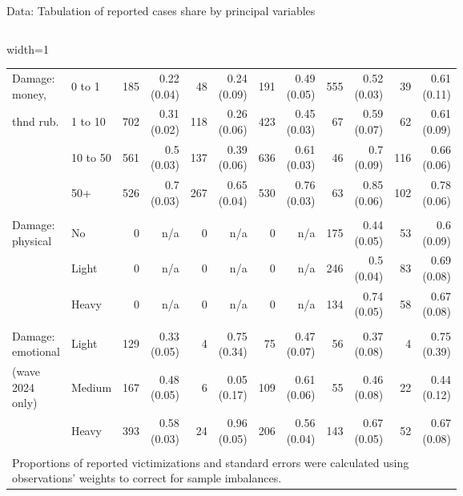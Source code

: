 \documentclass{beamer}
\begin{document}
\begin{frame}{Data: Tabulation of reported cases share by principal variables}
\begin{columns}
\begin{adjustbox}{width=1\textwidth}
\begin{tabular}{llrrrrrrrrrr}
					Damage: money,& 0 to 1 & 185 & 0.22 (0.04) & 48 & 0.24 (0.09) & 191 & 0.49 (0.05) & 555 & 0.52 (0.03) & 39 & 0.61 (0.11) \\ 
					thnd rub. & 1 to 10 & 702 & 0.31 (0.02) & 118 & 0.26 (0.06) & 423 & 0.45 (0.03) & 67 & 0.59 (0.07) & 62 & 0.61 (0.09) \\ 
					& 10 to 50 & 561 & 0.5 (0.03) & 137 & 0.39 (0.06) & 636 & 0.61 (0.03) & 46 & 0.7 (0.09) & 116 & 0.66 (0.06) \\ 
					& 50+ & 526 & 0.7 (0.03) & 267 & 0.65 (0.04) & 530 & 0.76 (0.03) & 63 & 0.85 (0.06) & 102 & 0.78 (0.06) \\ 
					\vspace{1pt}\\
					Damage: physical & No & 0 & n/a & 0 & n/a & 0 & n/a & 175 & 0.44 (0.05) & 53 & 0.6 (0.09) \\ 
					& Light & 0 & n/a & 0 & n/a & 0 & n/a & 246 & 0.5 (0.04) & 83 & 0.69 (0.08) \\ 
					& Heavy & 0 & n/a & 0 & n/a & 0 & n/a & 134 & 0.74 (0.05) & 58 & 0.67 (0.08) \\ 
					\vspace{1pt}\\
					Damage: emotional & Light & 129 & 0.33 (0.05) & 4 & 0.75 (0.34) & 75 & 0.47 (0.07) & 56 & 0.37 (0.08) & 4 & 0.75 (0.39) \\ 
					(wave 2024 only) & Medium & 167 & 0.48 (0.05) & 6 & 0.05 (0.17) & 109 & 0.61 (0.06) & 55 & 0.46 (0.08) & 22 & 0.44 (0.12) \\ 
					& Heavy & 393 & 0.58 (0.03) & 24 & 0.96 (0.05) & 206 & 0.56 (0.04) & 143 & 0.67 (0.05) & 52 & 0.67 (0.08) \\ 
					\bottomrule
					\vspace{1pt}\\
					\multicolumn{12}{l}{\small Proportions of reported victimizations and standard errors were calculated using observations' weights to correct for sample imbalances.}
				\end{tabular}
			\end{adjustbox}
		\end{columns}
	\end{frame}
		
\end{document}
